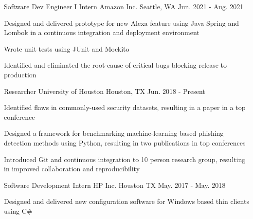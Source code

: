 \begin{cventries}
  \cventry
    {Software Dev Engineer I Intern} %
    {Amazon Inc.} %
    {Seattle, WA} %
    {Jun. 2021 - Aug. 2021} %
    {
      \begin{cvitems} %
        \item {Designed and delivered prototype for new Alexa feature using Java Spring and Lombok in a continuous integration and deployment environment}
        \item {Wrote unit tests using JUnit and Mockito}
        \item {Identified and eliminated the root-cause of critical bugs blocking release to production}
      \end{cvitems}
    }
  \cventry
    {Researcher} %
    {University of Houston} %
    {Houston, TX} %
    {Jun. 2018 - Present} %
    {
      \begin{cvitems} %
        \item {Identified flaws in commonly-used security datasets, resulting in a paper in a top conference}
        \item {Designed a framework for benchmarking machine-learning based phishing detection methods using Python, resulting in two publications in top conferences}
        \item {Introduced Git and continuous integration to 10 person research group, resulting in improved collaboration and reproducibility}
      \end{cvitems}
    }
  \cventry
    {Software Development Intern} %
    {HP Inc.} %
    {Houston TX} %
    {May. 2017 - May. 2018} %
    {
      \begin{cvitems} %
        \item {Designed and delivered new configuration software for Windows based thin clients using C\#}
      \end{cvitems}
    }
\end{cventries}
